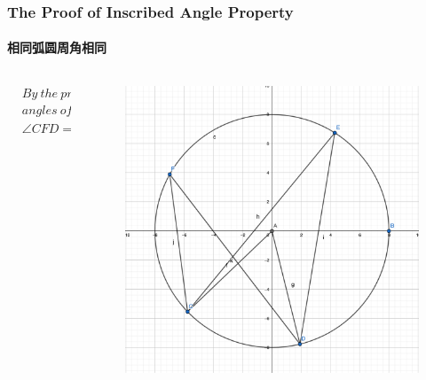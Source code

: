 \documentclass[
	11pt, %
]{beamer}
\begin{document}



\begin{frame}
\frametitle{The Proof of Inscribed Angle Property}
\framesubtitle{相同弧圆周角相同}

\begin{columns}[t] 
		\begin{column}{0.4\textwidth} %
			\begin{equation*}
			\begin{aligned}
			&By\ the\ property\ of\ central\ \\
			&angles\ of\ triangles,\\
			&\angle CFD = \frac{1}{2}\angle CAD = \angle CED 
			\end{aligned}
			\end{equation*}
		\end{column}
		\begin{column}{0.6\textwidth} %
			\begin{figure}
				\includegraphics[width=\linewidth]{Inscribed_Angle.png}
			\end{figure}
		\end{column}
	\end{columns}
\end{frame}
\end{document}
